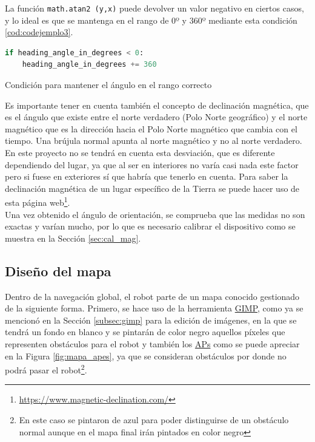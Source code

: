 La función \verb|math.atan2 (y,x)| puede devolver un valor negativo en ciertos casos, y lo ideal es que se mantenga en el rango de 0º y 360º mediante esta condición \ref{cod:codejemplo3}.


\begin{code}[H]
\begin{lstlisting}[language=Python]
if heading_angle_in_degrees < 0:
    heading_angle_in_degrees += 360
\end{lstlisting}
\caption[Condición para mantener el ángulo en el rango correcto]{Condición para mantener el ángulo en el rango correcto}
\label{cod:codejemplo3}
\end{code}


Es importante tener en cuenta también el concepto de declinación magnética, que es el ángulo que existe entre el norte verdadero (Polo Norte geográfico) y el norte magnético que es la dirección hacia el Polo Norte magnético que cambia con el tiempo. Una brújula normal apunta al norte magnético y no al norte verdadero. En este proyecto no se tendrá en cuenta esta desviación, que es diferente dependiendo del lugar, ya que al ser en interiores no varía casi nada este factor pero si fuese en exteriores sí que habría que tenerlo en cuenta. Para saber la declinación magnética de un lugar específico de la Tierra se puede hacer uso de esta página web\footnote{\url{https://www.magnetic-declination.com/}}.\\


Una vez obtenido el ángulo de orientación, se comprueba que las medidas no son exactas y varían mucho, por lo que es necesario calibrar el dispositivo como se muestra en la Sección \ref{sec:cal_mag}.



\subsection{Diseño del mapa}
\label{subsec:diseño_mapa}

Dentro de la navegación global, el robot parte de un mapa conocido gestionado de la siguiente forma. Primero, se hace uso de la herramienta \hyperlink{GIMP}{GIMP}, como ya se mencionó en la Sección \ref{subsec:gimp} para la edición de imágenes, en la que se tendrá un fondo en blanco y se pintarán de color negro aquellos píxeles que representen obstáculos para el robot y también los \hyperlink{APs}{APs} como se puede apreciar en la Figura \ref{fig:mapa_apes}, ya que se consideran obstáculos por donde no podrá pasar el robot\footnote{En este caso se pintaron de azul para poder distinguirse de un obstáculo normal aunque en el mapa final irán pintados en color negro}.

